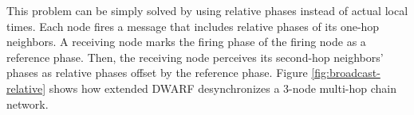 This problem can be simply solved by using relative phases instead of actual local times. Each node fires a message that includes relative phases of its one-hop neighbors. A receiving node marks the firing phase of the firing node as a reference phase. Then, the receiving node perceives its second-hop neighbors' phases as relative phases offset by the reference phase. Figure \ref{fig:broadcast-relative} shows how extended DWARF desynchronizes a 3-node multi-hop chain network.

\begin{figure}[!t]
\centerline{
	\hfil
	}
\end{figure}
